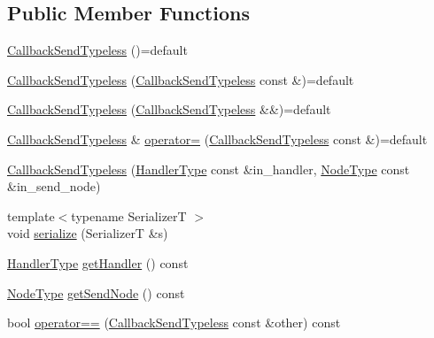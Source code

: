 \subsection*{Public Member Functions}
\begin{DoxyCompactItemize}
\item 
\hyperlink{structvt_1_1pipe_1_1callback_1_1_callback_send_typeless_a23a6190d53f6eeb5e76ddce13fe64180}{Callback\+Send\+Typeless} ()=default
\item 
\hyperlink{structvt_1_1pipe_1_1callback_1_1_callback_send_typeless_a01b989d1549051d16211f71f3f355aab}{Callback\+Send\+Typeless} (\hyperlink{structvt_1_1pipe_1_1callback_1_1_callback_send_typeless}{Callback\+Send\+Typeless} const \&)=default
\item 
\hyperlink{structvt_1_1pipe_1_1callback_1_1_callback_send_typeless_a3d85016dda42df66f15fad0e62ff3dfc}{Callback\+Send\+Typeless} (\hyperlink{structvt_1_1pipe_1_1callback_1_1_callback_send_typeless}{Callback\+Send\+Typeless} \&\&)=default
\item 
\hyperlink{structvt_1_1pipe_1_1callback_1_1_callback_send_typeless}{Callback\+Send\+Typeless} \& \hyperlink{structvt_1_1pipe_1_1callback_1_1_callback_send_typeless_ab4637d4587695d0a0883aa2f547e2b0b}{operator=} (\hyperlink{structvt_1_1pipe_1_1callback_1_1_callback_send_typeless}{Callback\+Send\+Typeless} const \&)=default
\item 
\hyperlink{structvt_1_1pipe_1_1callback_1_1_callback_send_typeless_a40a527e1f723fa6caa9268f24b9d1183}{Callback\+Send\+Typeless} (\hyperlink{namespacevt_af64846b57dfcaf104da3ef6967917573}{Handler\+Type} const \&in\+\_\+handler, \hyperlink{namespacevt_a866da9d0efc19c0a1ce79e9e492f47e2}{Node\+Type} const \&in\+\_\+send\+\_\+node)
\item 
{\footnotesize template$<$typename SerializerT $>$ }\\void \hyperlink{structvt_1_1pipe_1_1callback_1_1_callback_send_typeless_a843c03610729c912e3019aae5c1a74a2}{serialize} (SerializerT \&s)
\item 
\hyperlink{namespacevt_af64846b57dfcaf104da3ef6967917573}{Handler\+Type} \hyperlink{structvt_1_1pipe_1_1callback_1_1_callback_send_typeless_a6792e97c34e98f4b117cae791c582317}{get\+Handler} () const
\item 
\hyperlink{namespacevt_a866da9d0efc19c0a1ce79e9e492f47e2}{Node\+Type} \hyperlink{structvt_1_1pipe_1_1callback_1_1_callback_send_typeless_a73489917b0876b98d0a8e2568148c9a8}{get\+Send\+Node} () const
\item 
bool \hyperlink{structvt_1_1pipe_1_1callback_1_1_callback_send_typeless_a0dd54476c2ab4f7222660b57e11ee659}{operator==} (\hyperlink{structvt_1_1pipe_1_1callback_1_1_callback_send_typeless}{Callback\+Send\+Typeless} const \&other) const

\end{DoxyCompactItemize}
